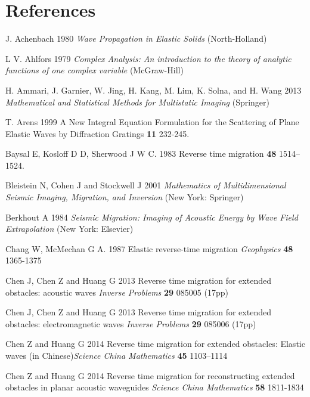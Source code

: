 \documentclass[11pt]{iopart}
\begin{document}
\section*{References}
\begin{thebibliography}{99}
	J. Achenbach 1980 {\em Wave Propagation in Elastic Solids }(North-Holland)
	
	L V. Ahlfors 1979 {\em Complex Analysis: An introduction to the theory of analytic functions of one complex variable }(McGraw-Hill)
	
	H. Ammari, J. Garnier, W. Jing, H. Kang, M. Lim, K. Solna, and H. Wang 2013 {\em Mathematical and Statistical Methods for Multistatic Imaging} (Springer)
	
	T. Arens 1999 {A New Integral Equation Formulation for the Scattering of Plane Elastic Waves by Diffraction Gratings} {\bf 11} 232-245.
	
	Baysal E, Kosloff D D, Sherwood J W C. 1983 {Reverse time migration} {\bf 48} 1514--1524.
	
	Bleistein N, Cohen J and Stockwell J 2001 {\em Mathematics of Multidimensional Seismic Imaging, Migration, and Inversion} (New York: Springer)
	
	{Berkhout A}  1984 {\em Seismic Migration: Imaging of Acoustic Energy by Wave Field Extrapolation}  (New York: Elsevier)
	
	Chang W, McMechan G A. 1987 {Elastic reverse-time migration} {\it Geophysics} {\bf 48}  1365-1375
	
	Chen J,  Chen Z and  Huang G 2013 {Reverse time migration for extended obstacles: acoustic waves}  {\it Inverse Problems} {\bf 29}  085005 (17pp)
	
	Chen J,  Chen Z and  Huang G 2013 {Reverse time migration for extended obstacles: electromagnetic waves} {\it Inverse Problems}
	{\bf 29} 085006 (17pp)
	
	Chen Z  and  Huang G 2014 {Reverse time migration for extended obstacles: Elastic waves} (in Chinese){\it Science China Mathematics} {\bf 45} 1103--1114
	
	Chen Z  and  Huang G 2014 {Reverse time migration for reconstructing extended obstacles in planar acoustic waveguides} {\it Science China Mathematics} {\bf 58} 1811-1834
	

\end{thebibliography}
\end{document}
